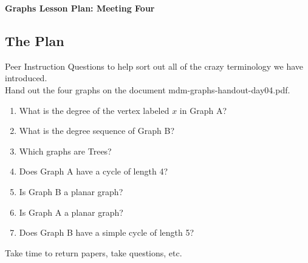 \documentclass[12pt]{amsart}
\theoremstyle{definition}
\begin{document}
\begin{center}
\textbf{\Huge
Graphs Lesson Plan: Meeting Four
}
\end{center}
\vspace{.5in}


\subsection*{The Plan}

Peer Instruction Questions to help sort out all of the crazy terminology we have introduced. \\

Hand out the four graphs on the document mdm-graphs-handout-day04.pdf. \\

\begin{enumerate}
\item What is the degree of the vertex labeled $x$ in Graph A?
\item What is the degree sequence of Graph B?
\item Which graphs are Trees?
\item Does Graph A have a cycle of length 4?
\item Is Graph B a planar graph?
\item Is Graph A a planar graph?
\item Does Graph B have a simple cycle of length 5?\\
\end{enumerate}

Take time to return papers, take questions, etc.
\end{document}
